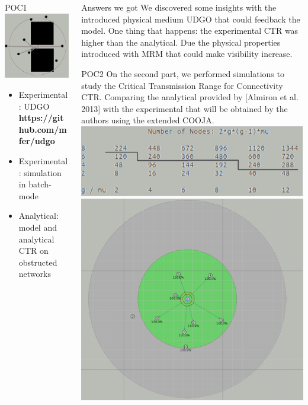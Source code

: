 \documentclass[final,hyperref={pdfpagelabels=false}]{beamer}
\begin{document}
\begin{frame}{}
\begin{columns}[t]
\begin{column}{.48\linewidth}
\begin{block}{POC1}
          \includegraphics[width=0.35\linewidth]{udgo}
          \begin{itemize}
          \item Experimental: UDGO  {\bf https://github.com/mfer/udgo}
          \item Experimental: simulation in batch-mode
          \item Analytical: model and analytical CTR on obstructed networks
          \end{itemize}
        \end{block}
      \end{column}
      \begin{column}{.48\linewidth}
        \begin{block}{Answers we got}
          \centering
          We discovered some insights with the introduced physical medium UDGO that could
          feedback the model. One thing that happens: the experimental CTR was higher
          than the analytical. Due the physical properties introduced with MRM that could make
          visibility increase.
        \end{block}
        \begin{block}{POC2}
          \centering
          On the second part, we performed simulations to study the Critical Transmission Range for Connectivity CTR. Comparing the analytical provided by [Almiron et al. 2013] with the experimental that will be obtained by the authors using the extended COOJA. \newline
          \includegraphics[width=0.9\linewidth]{nNodes} \newline
          \includegraphics[width=0.35\linewidth]{cooja}

\end{block}
\end{column}
\end{columns}
\end{frame}
\end{document}
